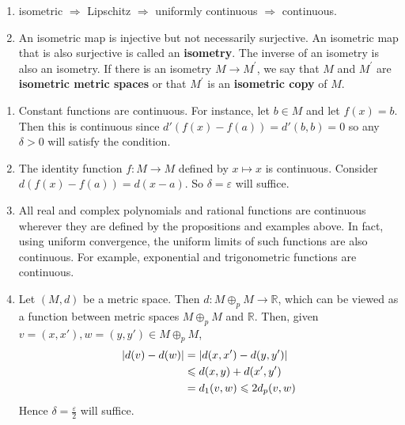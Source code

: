 \documentclass[a4paper,11pt]{article}
\begin{document}
\begin{note}
    \begin{enumerate}
        \item isometric $\Longrightarrow$ Lipschitz $\Longrightarrow$ uniformly continuous $\Longrightarrow$ continuous.
        \item An isometric map is injective but not necessarily surjective. An isometric map that is also surjective is called an \textbf{isometry}. The inverse of an isometry is also an isometry. If there is an isometry $M \rightarrow M^{\prime}$, we say that $M$ and $M^{\prime}$ are \textbf{isometric metric spaces} or that $M^{\prime}$ is an \textbf{isometric copy} of $M$.
    \end{enumerate}
\end{note}

\begin{example}
	\begin{enumerate}
        \item Constant functions are continuous.
        For instance, let \( b \in M \) and let \( f(x) = b \).
        Then this is continuous since \( d'(f(x) - f(a)) = d'(b,b) = 0 \) so any \( \delta > 0 \) will satisfy the condition.
    
        \item The identity function \( f \colon M \to M \) defined by \( x \mapsto x \) is continuous.
        Consider \( d(f(x) - f(a)) = d(x-a) \).
        So \( \delta = \varepsilon \) will suffice.
    
        \item All real and complex polynomials and rational functions are continuous wherever they are defined by the propositions and examples above.
        In fact, using uniform convergence, the uniform limits of such functions are also continuous.
        For example, exponential and trigonometric functions are continuous.
    
        \item Let \( (M, d) \) be a metric space.
        Then \( d \colon M \oplus_p M \to \mathbb R \), which can be viewed as a function between metric spaces \( M \oplus_p M \) and \( \mathbb R \).
        Then, given \( v = (x,x'), w = (y,y') \in M \oplus_p M \),
        \begin{align*}
            \abs{d(v) - d(w)} &= \abs{d(x,x') - d(y,y')} \\ 
            &\leqslant d(x,y) + d(x',y') \\ 
            &= d_1(v,w) \leqslant 2 d_p(v,w)
        \end{align*}
        Hence \( \delta = \frac{\varepsilon}{2} \) will suffice.


\end{enumerate}
\end{example}
\end{document}
